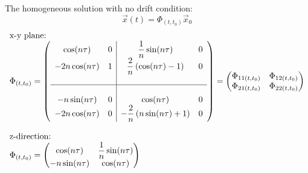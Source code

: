 \documentclass[11pt, a4paper]{article}
\begin{document}
The homogeneous solution with no drift condition:
\begin{equation}
    \vec{x}(t) = \Phi_{(t,t_0)}\vec{x}_0
\end{equation}
\begin{equation}
    \begin{array}{l}
        \text{x-y plane:} \\
        \Phi_{(t,t_0)} = \left(\begin{array}{cc|cc}
            \cos(n\tau) & 0 &\displaystyle \frac{1}{n}\sin(n\tau) & 0 \\ 
            -2n\cos(n\tau) & 1 &\displaystyle \frac{2}{n}\left(\cos(n\tau)-1\right) &0\\ &&& \\ \hline &&& \\
            -n\sin(n\tau) & 0 & \cos(n\tau) & 0 \\
            -2n\cos(n\tau) & 0 & \displaystyle-\frac{2}{n}\left(n\sin(n\tau)+1\right) & 0 
        \end{array}\right) = \begin{pmatrix}
            \Phi_{11(t,t_0)} & \Phi_{12(t,t_0)} \\
            \Phi_{21(t,t_0)} & \Phi_{22(t,t_0)}
        \end{pmatrix} \\ \\ 
    \text{z-direction:} \\
    \Phi_{(t,t_0)} = \begin{pmatrix}
        \cos(n\tau) & \displaystyle\frac{1}{n}\sin(n\tau) \\
        -n\sin(n\tau) & \cos(n\tau)
    \end{pmatrix}
    \end{array}
\end{equation}
\end{document}

